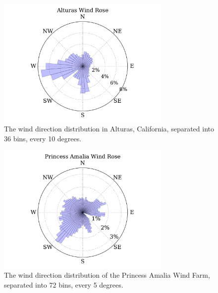 \begin{figure}[htbp]
  \centering
  \includegraphics[width=0.75\textwidth]{Figures/alturas_rose.pdf}
  \caption{\label{alturas} The wind direction distribution in Alturas, California, separated into 36 bins, every 10 degrees.}
\end{figure}

\begin{figure}[htbp]
  \centering
  \includegraphics[width=0.75\textwidth]{Figures/amalia_rose.pdf}
  \caption{\label{amalia} The wind direction distribution of the Princess Amalia Wind Farm, separated into 72 bins, every 5 degrees.}
\end{figure}

